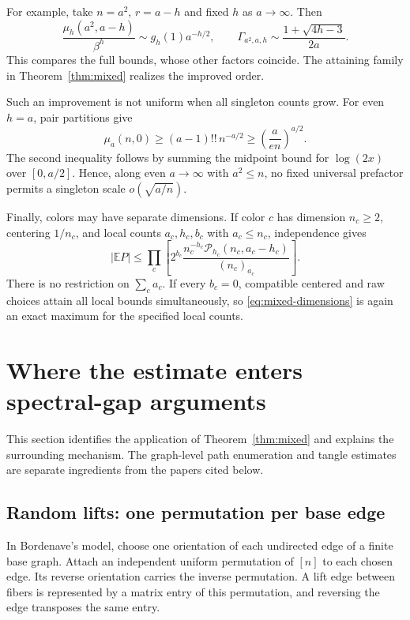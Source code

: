 \documentclass[11pt]{article}
\theoremstyle{definition}
\theoremstyle{remark}
\newcommand{\E}{\mathbb E}
\newcommand{\1}{\mathbf 1}
\begin{document}
For example, take $n=a^2$, $r=a-h$ and fixed $h$ as $a\to\infty$. Then
\[
\frac{\mu_h(a^2,a-h)}{\beta^h}
\sim g_h(1)a^{-h/2},
\qquad
\Gamma_{a^2,a,h}\sim\frac{1+\sqrt{4h-3}}{2a}.
\]
This compares the full bounds, whose other factors coincide. The attaining family in Theorem~\ref{thm:mixed} realizes the improved order.

Such an improvement is not uniform when all singleton counts grow. For even $h=a$, pair partitions give
\[
\mu_a(n,0)\ge(a-1)!!\,n^{-a/2}
\ge\left(\frac{a}{en}\right)^{a/2}.
\]
The second inequality follows by summing the midpoint bound for $\log(2x)$ over $[0,a/2]$. Hence, along even $a\to\infty$ with $a^2\le n$, no fixed universal prefactor permits a singleton scale $o(\sqrt{a/n})$.

Finally, colors may have separate dimensions. If color $c$ has dimension $n_c\ge2$, centering $1/n_c$, and local counts $a_c,h_c,b_c$ with $a_c\le n_c$, independence gives
\begin{equation}\label{eq:mixed-dimensions}
|\E P|\le\prod_c
\left[
2^{b_c}\frac{n_c^{-h_c}\mathcal P_{h_c}(n_c,a_c-h_c)}
{(n_c)_{a_c}}
\right].
\end{equation}
There is no restriction on $\sum_c a_c$. If every $b_c=0$, compatible centered and raw choices attain all local bounds simultaneously, so \eqref{eq:mixed-dimensions} is again an exact maximum for the specified local counts.


\section{Where the estimate enters spectral-gap arguments}\label{sec:spectral}

This section identifies the application of Theorem~\ref{thm:mixed} and explains the surrounding mechanism. The graph-level path enumeration and tangle estimates are separate ingredients from the papers cited below.

\subsection{Random lifts: one permutation per base edge}

In Bordenave's model, choose one orientation of each undirected edge of a finite base graph. Attach an independent uniform permutation of $[n]$ to each chosen edge. Its reverse orientation carries the inverse permutation. A lift edge between fibers is represented by a matrix entry of this permutation, and reversing the edge transposes the same entry.
\end{document}
